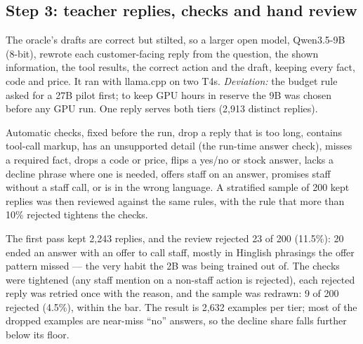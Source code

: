 \documentclass[11pt,a4paper]{article}
\begin{document}
\subsection{Step 3: teacher replies, checks and hand review}
The oracle's drafts are correct but stilted, so a larger open model, Qwen3.5-9B (8-bit), rewrote each customer-facing reply
from the question, the shown information, the tool results, the correct action and the draft, keeping every fact, code and
price. It ran with llama.cpp on two T4s. \emph{Deviation:} the budget rule asked for a 27B pilot first; to keep GPU hours
in reserve the 9B was chosen before any GPU run. One reply serves both tiers (2,913 distinct replies).

Automatic checks, fixed before the run, drop a reply that is too long, contains tool-call markup, has an unsupported
detail (the run-time answer check), misses a required fact, drops a code or price, flips a yes/no or stock answer, lacks a
decline phrase where one is needed, offers staff on an answer, promises staff without a staff call, or is in the wrong
language. A stratified sample of 200 kept replies was then reviewed against the same rules, with the rule that more
than 10\% rejected tightens the checks.

The first pass kept 2,243 replies, and the review rejected 23 of 200 (11.5\%): 20 ended an answer with an offer to call
staff, mostly in Hinglish phrasings the offer pattern missed --- the very habit the 2B was being trained out of. The checks
were tightened (any staff mention on a non-staff action is rejected), each rejected reply was retried once with the
reason, and the sample was redrawn: 9 of 200 rejected (4.5\%), within the bar. The result is 2,632 examples per tier;
most of the dropped examples are near-miss ``no'' answers, so the decline share falls further below its floor.
\end{document}
